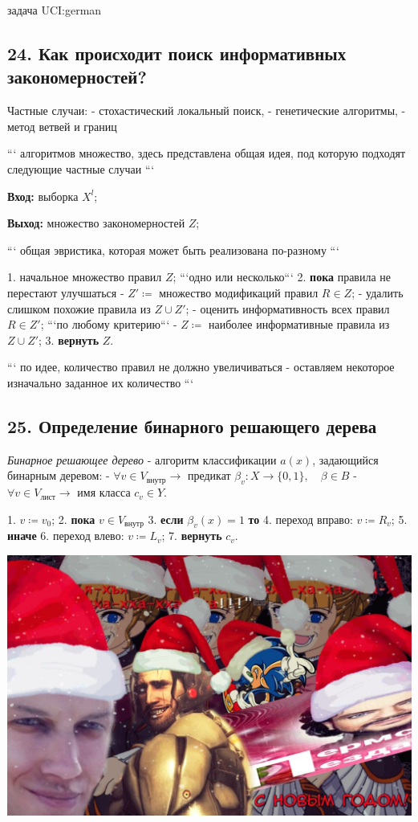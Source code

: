 задача UCI:german

\subsection{24. Как происходит поиск информативных закономерностей?}

Частные случаи:
- стохастический локальный поиск,
- генетические алгоритмы,
- метод ветвей и границ

```
алгоритмов множество, здесь представлена общая идея, под которую подходят
следующие частные случаи
```

\textbf{Вход:} выборка $X^l$;

\textbf{Выход:} множество закономерностей $Z$;

```
общая эвристика, которая может быть реализована по-разному
```

1. начальное множество правил $Z$; ```одно или несколько```
2. \textbf{пока} правила не перестают улучшаться
    - $Z' \coloneqq$ множество модификаций правил $R \in Z$;
    - удалить слишком похожие правила из $Z \cup Z'$;
    - оценить информативность всех правил $R \in Z'$;
    ```по любому критерию```
    - $Z \coloneqq$ наиболее информативные правила из $Z \cup Z'$;
3. \textbf{вернуть} $Z$.

```
по идее, количество правил не должно увеличиваться - оставляем некоторое
изначально заданное их количество
```

\subsection{25. Определение бинарного решающего дерева}

\textit{Бинарное решающее дерево} - алгоритм классификации $a(x)$, задающийся
бинарным деревом:
- $\forall{v} \in V_{\text{внутр}} \rightarrow$ предикат $\beta_v : X \rightarrow {\lbrace 0, 1 \rbrace}, \quad \beta \in B$
- $\forall{v} \in V_{\text{лист}} \rightarrow$ имя класса $c_v \in Y$.
 
1. $v \coloneqq v_0$;
2. \textbf{пока} $v \in V_{внутр}$
3. \textbf{если} $\beta_v{(x)} = 1$ \textbf{то}
4. переход вправо: $v \coloneqq R_v$;
5. \textbf{иначе}
6. переход влево: $v \coloneqq L_v$;
7. \textbf{вернуть} $c_v$.

\includegraphics[scale=0.3]{figures/samplefigure.jpg}

